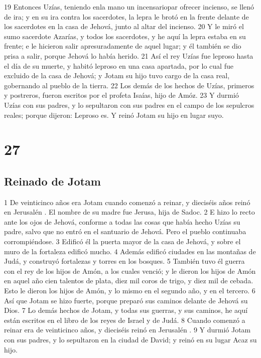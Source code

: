 19 Entonces Uzías, teniendo enla mano un incensariopar ofrecer incienso, se llenó de ira; y en su ira contra los sacerdotes, la lepra le brotó en la frente delante de los sacerdotes en la casa de Jehová, junto al altar del incienso.
20 Y le miró el sumo sacerdote Azarías, y todos los sacerdotes, y he aquí la lepra estaba en su frente; e le hicieron salir apresuradamente de aquel lugar; y él también se dio prisa a salir, porque Jehová lo había herido.
21 Así el rey Uzías fue leproso hasta el día de su muerte, y habitó leproso en una casa apartada, por lo cual fue excluido de la casa de Jehová; y Jotam su hijo tuvo cargo de la casa real, gobernando al pueblo de la tierra.
22 Los demás de los hechos de Uzías, primeros y postreros, fueron escritos por el profeta Isaías, hijo de Amóz.
23 Y durmió Uzías con sus padres, y lo sepultaron con sus padres en el campo de los sepulcros reales; porque dijeron: Leproso es. Y reinó Jotam su hijo en lugar suyo.

\chapter{27}

\section*{Reinado de Jotam}

1 De veinticinco años era Jotam cuando comenzó a reinar, y dieciséis años reinó en Jerusalén . El nombre de su madre fue Jerusa, hija de Sadoc.
2 E hizo lo recto ante los ojos de Jehová, conforme a todas las cosas que había hecho Uzías su padre, salvo que no entró en el santuario de Jehová. Pero el pueblo continuaba corrompiéndose.
3 Edificó él la puerta mayor de la casa de Jehová, y sobre el muro de la fortaleza edificó mucho.
4 Además edificó ciudades en las montañas de Judá, y construyó fortalezas y torres en los bosques.
5 También tuvo él guerra con el rey de los hijos de Amón, a los cuales venció; y le dieron los hijos de Amón en aquel año cien talentos de plata,  diez mil coros de trigo, y diez mil de cebada. Esto le dieron los hijos de Amón, y lo mismo en el segundo año, y en el tercero.
6 Así que Jotam se hizo fuerte, porque preparó sus caminos delante de Jehová su Dios.
7 Lo demás hechos de Jotam, y todas sus guerras, y sus caminos, he aquí están escritos en el libro de los reyes de Israel y de Judá.
8 Cuando comenzó a reinar era de veinticinco años, y dieciséis reinó en Jerusalén .
9 Y durmió Jotam con sus padres, y lo sepultaron en la ciudad de David; y reinó en su lugar Acaz su hijo.

